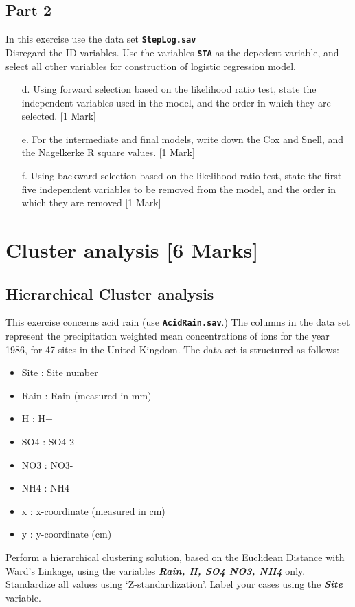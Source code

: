 \documentclass[12pt, a4paper]{article}
\theoremstyle{plain}
\theoremstyle{definition}
\theoremstyle{remark}
\begin{document}
\subsection{Part 2}
In this exercise use the data set \textbf{\texttt{StepLog.sav}}\\
Disregard the ID variables. Use the variables \textbf{\texttt{STA}} as the depedent variable, and select all other variables for construction of logistic regression model.
\begin{itemize}
\item[d.] Using forward selection based on the likelihood ratio test, state the independent variables used in the model, and the order in which they are selected. [1 Mark]
\item[e.] For the intermediate and final models, write down the Cox and Snell, and the Nagelkerke R square values. [1 Mark] %
\item[f.] Using backward selection based on the likelihood ratio test, state the first five independent variables to be removed from the model, and the order in which they are removed [1 Mark]
\end{itemize}
%

\newpage
\section{Cluster analysis [6 Marks]} %
\subsection{Hierarchical Cluster analysis}
This exercise concerns acid rain (use \textbf{\texttt{AcidRain.sav}}.)
The columns in the data set represent the precipitation weighted mean concentrations of ions for the year 1986, for 47 sites in the United Kingdom. The data set is structured as follows:
\begin{itemize}
\item Site : Site number
\item Rain : Rain (measured in mm)
\item H	: H+
\item SO4 : SO4-2
\item NO3 : NO3-
\item NH4 : NH4+
\item x	: x-coordinate (measured in cm)
\item y	: y-coordinate (cm)
\end{itemize}
Perform a hierarchical clustering solution, based on the Euclidean Distance with Ward's Linkage, using the variables \textbf{\textit{Rain, H, SO4 NO3,  NH4}} only. Standardize all values using `Z-standardization'. Label your cases using the \textbf{\textit{Site}} variable.
\end{document}
